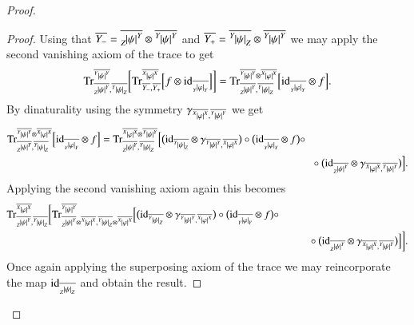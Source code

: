 \documentclass{amsart}
\def\tn{\textnormal}
\def\Trace{\tn{Tr}}
\def\ol{\overline}
\def\id{\tn{id}}
\newcommand{\inp}[1]{{#1_-}}
\newcommand{\outp}[1]{{#1_+}}
\newcommand{\feeddd}[3]{{\tensor*[^{#2}_{\color{white}{!}}]{{|#1|}}{^{#3}}}}%
\newcommand{\feeddc}[3]{{\tensor*[^{#2}]{{|#1|}}{_{#3}}}}
\newcommand{\feedcd}[3]{{\tensor*[_{#2}]{{|#1|}}{^{#3}}}}
\newcommand{\feedcc}[3]{{\tensor*[^{\color{white}{!}}_{#2}]{{|#1|}}{_{#3}}}}
\theoremstyle{remark}
\theoremstyle{definition}
\begin{document}
\begin{proof}
\begin{proof}
Using that $\ol{Y_-}=\ol{\feedcd{\psi}{Z}{Y}}\otimes\ol{\feeddd{\psi}{Y}{Y}}$ and $\ol{Y_+}=\ol{\feeddc{\psi}{Y}{Z}}\otimes\ol{\feeddd{\psi}{Y}{Y}}$ we may apply the second vanishing axiom of the trace to get
\[\Trace^{\ol{\feeddd{\psi}{Y}{Y}}}_{\ol{\feedcd{\psi}{Z}{Y}},\ol{\feeddc{\psi}{Y}{Z}}}
\bigg[\Trace^{\ol{\feeddd{\varphi}{X}{X}}}_{\ol{\inp{Y}},\ol{\outp{Y}}}\Big[f\otimes\id_{\ol{\feedcc{\varphi}{Y}{Y}}}\Big]\bigg]=\Trace^{\ol{\feeddd{\psi}{Y}{Y}}\otimes\ol{\feeddd{\varphi}{X}{X}}}_{\ol{\feedcd{\psi}{Z}{Y}},\ol{\feeddc{\psi}{Y}{Z}}}
\Big[\id_{\ol{\feedcc{\varphi}{Y}{Y}}}\otimes f\Big].\]
By dinaturality using the symmetry $\gamma_{\ol{\feeddd{\varphi}{X}{X}},\ol{\feeddd{\psi}{Y}{Y}}}$ we get
\begin{align*}
&\Trace^{\ol{\feeddd{\psi}{Y}{Y}}\otimes\ol{\feeddd{\varphi}{X}{X}}}_{\ol{\feedcd{\psi}{Z}{Y}},\ol{\feeddc{\psi}{Y}{Z}}}
\Big[\id_{\ol{\feedcc{\varphi}{Y}{Y}}}\otimes f\Big]
=\Trace^{\ol{\feeddd{\varphi}{X}{X}}\otimes\ol{\feeddd{\psi}{Y}{Y}}}_{\ol{\feedcd{\psi}{Z}{Y}},\ol{\feeddc{\psi}{Y}{Z}}}
\Big[
\big(\id_{\ol{\feeddc{\psi}{Y}{Z}}}\otimes\gamma_{\ol{\feeddd{\psi}{Y}{Y}},\ol{\feeddd{\varphi}{X}{X}}}\big)\circ\big(\id_{\ol{\feedcc{\varphi}{Y}{Y}}}\otimes f\big)\circ\\
&\hspace{4in}\circ\big(\id_{\ol{\feedcd{\psi}{Z}{Y}}}\otimes\gamma_{\ol{\feeddd{\varphi}{X}{X}},\ol{\feeddd{\psi}{Y}{Y}}}\big)
\Big].
\end{align*}
Applying the second vanishing axiom again this becomes
\begin{align*}
&\Trace^{\ol{\feeddd{\varphi}{X}{X}}}_{\ol{\feedcd{\psi}{Z}{Y}},\ol{\feeddc{\psi}{Y}{Z}}}
\bigg[
\Trace^{\ol{\feeddd{\psi}{Y}{Y}}}_{\ol{\feedcd{\psi}{Z}{Y}}\otimes\ol{\feeddd{\varphi}{X}{X}},\ol{\feeddc{\psi}{Y}{Z}}\otimes\ol{\feeddd{\varphi}{X}{X}}}
\Big[
\big(\id_{\ol{\feeddc{\psi}{Y}{Z}}}\otimes\gamma_{\ol{\feeddd{\psi}{Y}{Y}},\ol{\feeddd{\varphi}{X}{X}}}\big)\circ\big(\id_{\ol{\feedcc{\varphi}{Y}{Y}}}\otimes f\big)\circ\\
&\hspace{4in}\circ\big(\id_{\ol{\feedcd{\psi}{Z}{Y}}}\otimes\gamma_{\ol{\feeddd{\varphi}{X}{X}},\ol{\feeddd{\psi}{Y}{Y}}}\big)
\Big]
\bigg].
\end{align*}
Once again applying the superposing axiom of the trace we may reincorporate the map $\id_{\ol{\feedcc{\psi}{Z}{Z}}}$ and obtain the result.
\end{proof}


\end{proof}
\end{document}

